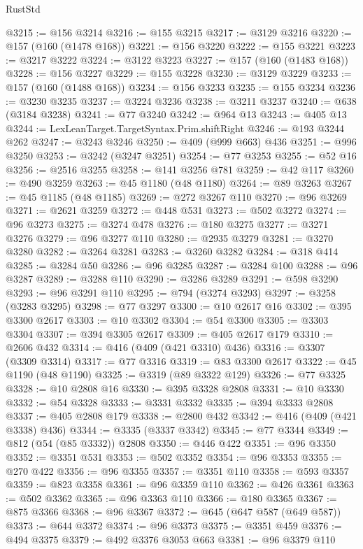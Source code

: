 \begin{lexlean}{RustStd}
\begin{coremodule}
{\begin{coremodule}
{{{{{{{{{{{{{{{{{{{{{{{{{{{{{{{{{{{{{{{{{{{{{{{{{{{{{{{{{{{{@3215 := @156 @3214
@3216 := @155 @3215
@3217 := @3129 @3216
@3220 := @157 (@160 (@1478 @168))
@3221 := @156 @3220
@3222 := @155 @3221
@3223 := @3217 @3222
@3224 := @3122 @3223
@3227 := @157 (@160 (@1483 @168))
@3228 := @156 @3227
@3229 := @155 @3228
@3230 := @3129 @3229
@3233 := @157 (@160 (@1488 @168))
@3234 := @156 @3233
@3235 := @155 @3234
@3236 := @3230 @3235
@3237 := @3224 @3236
@3238 := @3211 @3237
@3240 := @638 (@3184 @3238)
@3241 := @77 @3240
@3242 := @964 @13
@3243 := @405 @13
@3244 := LexLeanTarget.TargetSyntax.Prim.shiftRight
@3246 := @193 @3244 @262
@3247 := @3243 @3246
@3250 := @409 (@999 @663) @436
@3251 := @996 @3250
@3253 := @3242 (@3247 @3251)
@3254 := @77 @3253
@3255 := @52 @16
@3256 := @2516 @3255
@3258 := @141 @3256 @781
@3259 := @42 @117
@3260 := @490 @3259
@3263 := @45 @1180 (@48 @1180)
@3264 := @89 @3263
@3267 := @45 @1185 (@48 @1185)
@3269 := @272 @3267 @110
@3270 := @96 @3269
@3271 := @2621 @3259
@3272 := @448 @531
@3273 := @502 @3272
@3274 := @96 @3273
@3275 := @3274 @478
@3276 := @180 @3275
@3277 := @3271 @3276
@3279 := @96 @3277 @110
@3280 := @2935 @3279
@3281 := @3270 @3280
@3282 := @3264 @3281
@3283 := @3260 @3282
@3284 := @318 @414
@3285 := @3284 @50
@3286 := @96 @3285
@3287 := @3284 @100
@3288 := @96 @3287
@3289 := @3288 @110
@3290 := @3286 @3289
@3291 := @598 @3290
@3293 := @96 @3291 @110
@3295 := @794 (@3274 @3293)
@3297 := @3258 (@3283 @3295)
@3298 := @77 @3297
@3300 := @10 @2617 @16
@3302 := @395 @3300 @2617
@3303 := @10 @3302
@3304 := @54 @3300
@3305 := @3303 @3304
@3307 := @394 @3305 @2617
@3309 := @405 @2617 @179
@3310 := @2606 @432
@3314 := @416 (@409 (@421 @3310) @436)
@3316 := @3307 (@3309 @3314)
@3317 := @77 @3316
@3319 := @83 @3300 @2617
@3322 := @45 @1190 (@48 @1190)
@3325 := @3319 (@89 @3322 @129)
@3326 := @77 @3325
@3328 := @10 @2808 @16
@3330 := @395 @3328 @2808
@3331 := @10 @3330
@3332 := @54 @3328
@3333 := @3331 @3332
@3335 := @394 @3333 @2808
@3337 := @405 @2808 @179
@3338 := @2800 @432
@3342 := @416 (@409 (@421 @3338) @436)
@3344 := @3335 (@3337 @3342)
@3345 := @77 @3344
@3349 := @812 (@54 (@85 @3332)) @2808
@3350 := @446 @422
@3351 := @96 @3350
@3352 := @3351 @531
@3353 := @502 @3352
@3354 := @96 @3353
@3355 := @270 @422
@3356 := @96 @3355
@3357 := @3351 @110
@3358 := @593 @3357
@3359 := @823 @3358
@3361 := @96 @3359 @110
@3362 := @426 @3361
@3363 := @502 @3362
@3365 := @96 @3363 @110
@3366 := @180 @3365
@3367 := @875 @3366
@3368 := @96 @3367
@3372 := @645 (@647 @587 (@649 @587))
@3373 := @644 @3372
@3374 := @96 @3373
@3375 := @3351 @459
@3376 := @494 @3375
@3379 := @492 @3376 @3053 @663
@3381 := @96 @3379 @110
}}}}}}}}}}}}}}}}}}}}}}}}}}}}}}}}}}}}}}}}}}}}}}}}}}}}}}}}}}}}
\end{coremodule}}
\end{coremodule}
\end{lexlean}
